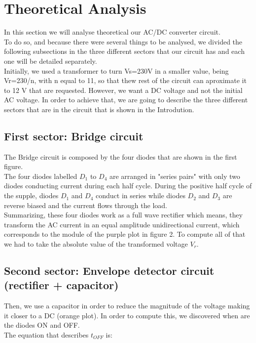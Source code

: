 \section{Theoretical Analysis}
\label{sec:analysis}

In this section we will analyse theoretical our AC/DC converter circuit. \\
To do so, and because there were several things to be analysed, we divided the following subsections in the three different sectors that our circuit has and each one will be detailed separately.\\
Initially, we used a transformer to turn Vs=230V in a smaller value, being Vr=230/n, with n equal to 11, so that thew
rest of the circuit can aproximate it to 12 V that are requested. However, we want a DC voltage and not the initial AC voltage. In order
to achieve that, we are going to describe the three different sectors that are in the circuit that is shown in the Introdution.\\


\subsection{First sector: Bridge circuit}

The Bridge circuit is composed by the four diodes that are shown in the first figure.\\
The four diodes labelled $D_1$ to $D_4$ are arranged in "series pairs" with only two diodes conducting current during each half cycle. During the positive half cycle of the supple, diodes $D_1$ and $D_4$ conduct in series while diodes $D_2$ and $D_3$ are reverse biased and the current flows through the load.\\
Summarizing, these four diodes work as a full wave rectifier which means, they transform the AC current in an equal
amplitude unidirectional current, which corresponds to the module of the purple plot in figure 2. To compute all of that we had to take the absolute value of the transformed voltage $V_r$.

\subsection{Second sector: Envelope detector circuit (rectifier + capacitor)}

Then, we use a capacitor in order to reduce the magnitude of the voltage making it closer to a DC (orange plot).
In order to compute this, we discovered when are the diodes ON and OFF.\\
The equation that describes $t_{OFF}$ is:

